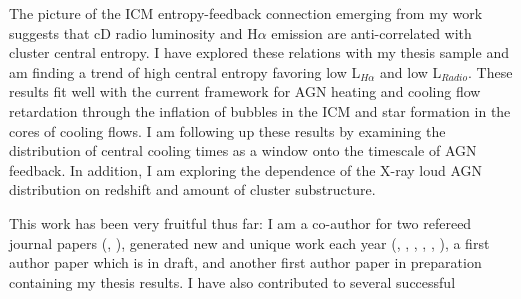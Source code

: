 \documentclass[11pt]{article}
\begin{document}
The picture of the ICM entropy-feedback connection emerging from my
work suggests that cD radio luminosity and H$\alpha$ emission are
anti-correlated with cluster central entropy. I have explored these
relations with my thesis sample and am finding a trend of high central
entropy favoring low L$_{H\alpha}$ and low L$_{Radio}$. These results
fit well with the current framework for AGN heating and cooling flow
retardation through the inflation of bubbles in the ICM and star
formation in the cores of cooling flows. I am following up these
results by examining the distribution of central cooling times as a
window onto the timescale of AGN feedback. In addition, I am exploring
the dependence of the X-ray loud AGN distribution on redshift and
amount of cluster substructure.

This work has been very fruitful thus far: I am a co-author for two
refereed journal papers (\cite{2007AJ....134...14D},
\cite{2006ApJ...643..730D}), generated new and unique work each year
(\cite{2008AAS},  \cite{2007Chandrasym}, \cite{2006AAS...209.7711D},
\cite{2005AAS...20713903C}, \cite{2004AAS...20514715C},
\cite{2004AAS...205.6020D}), a first author paper which is in draft,
and another first author paper in preparation containing my thesis
results. I have also contributed to several successful
\end{document}
